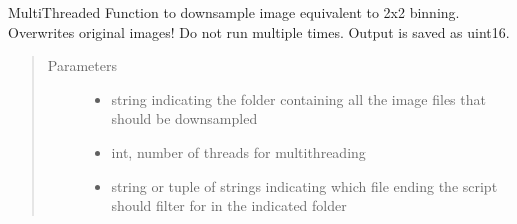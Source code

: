 \documentclass[a4paper,10pt,english,openany,oneside]{sphinxmanual}
\begin{document}
\begin{fulllineitems}
\label{\detokenize{pages/modules:vipertools.image_processing.downsample_folder}}
\sphinxAtStartPar
Multi\sphinxhyphen{}Threaded Function to downsample image equivalent to 2x2 binning. Overwrites original images! Do not run multiple times.
Output is saved as uint16.
\begin{quote}\begin{description}
\item[{Parameters}] \leavevmode\begin{itemize}
\item {} 
\sphinxAtStartPar
{} \textendash{} string indicating the folder containing all the image files that should be downsampled

\item {} 
\sphinxAtStartPar
{} \textendash{} int, number of threads for multithreading

\item {} 
\sphinxAtStartPar
{} \textendash{} string or tuple of strings indicating which file ending the script should filter for in the indicated folder

\end{itemize}

\end{description}\end{quote}

\end{fulllineitems}

\end{document}
